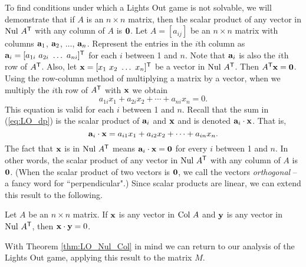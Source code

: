 To find conditions under which a Lights Out game is not solvable, we will demonstrate that  if $A$ is an $n \times n$ matrix, then the scalar product of any vector in $\text{Nul } A^{\mathsf{T}}$ with any column of $A$ is $\mathbf{0}$. Let $A = [a_{ij}]$ be an $n \times n$ matrix with columns $\mathbf{a}_1$, $\mathbf{a}_2$, $\ldots$, $\mathbf{a}_n$. Represent the entries in the $i$th column as  $\va_i = [a_{1i} \ a_{2i} \ \ldots \ a_{ni}]^{\tr}$ for each $i$ between 1 and $n$. Note that $\mathbf{a}_i$ is also the $i$th row of $A^{\mathsf{T}}$. Also, let $\mathbf{x} = [x_1 \ x_2 \ \ldots \ x_n]^{\mathsf{T}}$ be a vector in $\text{Nul } A^{\mathsf{T}}$. Then $A^{\mathsf{T}} \mathbf{x} = \mathbf{0}$. Using the row-column method of multiplying a matrix by a vector, when we multiply the $i$th row of $A^{\mathsf{T}}$ with $\mathbf{x}$ we obtain
    \begin{equation}
    a_{1i}x_1 + a_{2i}x_2 + \cdots + a_{ni}x_n = 0. \label{eq:LO_dp}
    \end{equation}
    This equation is valid for each $i$ between 1 and $n$. Recall that the sum in (\ref{eq:LO_dp}) is the scalar product of $\mathbf{a}_i$ and $\mathbf{x}$ and is denoted  $\mathbf{a}_i \cdot \mathbf{x}$. That is,
     \[\mathbf{a}_i \cdot \mathbf{x} = a_{i1}x_1 + a_{i2}x_2 + \cdots + a_{in}x_n.\]
     The fact that $\mathbf{x}$ is in $\text{Nul } A^{\mathsf{T}}$ means $\mathbf{a}_i \cdot \mathbf{x} = \mathbf{0}$ for every $i$ between 1 and $n$. In other words, the scalar product of any vector in $\text{Nul } A^{\mathsf{T}}$ with any column of $A$ is $\mathbf{0}$. (When the scalar product of two vectors is $\mathbf{0}$, we call the vectors \emph{orthogonal} -- a fancy word for ``perpendicular".) Since scalar products are linear, we can extend this result to the following.
     
 \begin{theorem} \label{thm:LO_Nul_Col} Let $A$ be an $n \times n$ matrix. If $\mathbf{x}$ is any vector in $\text{Col } A$ and $\mathbf{y}$ is any vector in $\text{Nul } A^{\mathsf{T}}$, then $\mathbf{x} \cdot \mathbf{y} = 0$. 
\end{theorem}
     
With Theorem \ref{thm:LO_Nul_Col} in mind we can return to our analysis of the Lights Out game, applying this result to the matrix $M$. 

